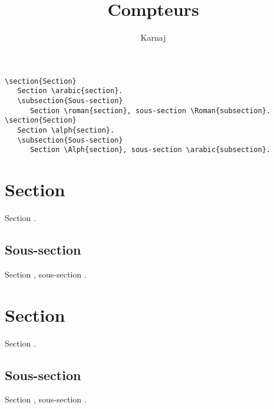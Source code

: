 \documentclass[fontsize=12pt,twoside=false,parskip=half,notitlepage,DIV=17,french]{scrbook}
\title{Compteurs}
\author{Karnaj}
\begin{document}
\makeatletter
\begin{center}
   \Huge \textbf{\textsf{\@title}} \Large

   \@author

   \Large \@date
\end{center}
\makeatother

\renewcommand\thesection{\arabic{section}}

\begin{verbatim}
\section{Section}
   Section \arabic{section}.
   \subsection{Sous-section}
      Section \roman{section}, sous-section \Roman{subsection}.
\section{Section}
   Section \alph{section}.
   \subsection{Sous-section}
      Section \Alph{section}, sous-section \arabic{subsection}.
\end{verbatim}

\section{Section}
   Section .
   \subsection{Sous-section}
      Section , sous-section .
\section{Section}
   Section .
   \subsection{Sous-section}
      Section , sous-section .

\newpage

\setcounter{section}{0}
\setcounter{subsection}{0}
\end{document}
